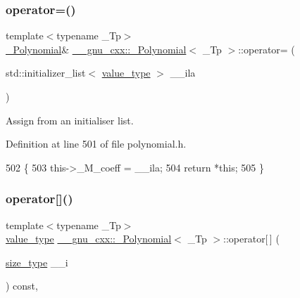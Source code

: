 \subsubsection{\texorpdfstring{operator=()}{operator=()}\hspace{0.1cm}{\footnotesize\ttfamily [4/4]}}
{\footnotesize\ttfamily template$<$typename \+\_\+\+Tp$>$ \\
\hyperlink{class____gnu__cxx_1_1__Polynomial}{\+\_\+\+Polynomial}\& \hyperlink{class____gnu__cxx_1_1__Polynomial}{\+\_\+\+\_\+gnu\+\_\+cxx\+::\+\_\+\+Polynomial}$<$ \+\_\+\+Tp $>$\+::operator= (\begin{DoxyParamCaption}\item[{std\+::initializer\+\_\+list$<$ \hyperlink{class____gnu__cxx_1_1__Polynomial_a725563351f50e76084a7a016c06f8a53}{value\+\_\+type} $>$}]{\+\_\+\+\_\+ila }\end{DoxyParamCaption})\hspace{0.3cm}{\ttfamily [inline]}}

Assign from an initialiser list. 

Definition at line 501 of file polynomial.\+h.


\begin{DoxyCode}
502       \{
503         this->\_M\_coeff = \_\_ila;
504         \textcolor{keywordflow}{return} *\textcolor{keyword}{this};
505       \}
\end{DoxyCode}
\mbox{\label{class____gnu__cxx_1_1__Polynomial_adda717f35cc87205daf0ea7a16d5d1a7}} 
\subsubsection{\texorpdfstring{operator[]()}{operator[]()}\hspace{0.1cm}{\footnotesize\ttfamily [1/2]}}
{\footnotesize\ttfamily template$<$typename \+\_\+\+Tp$>$ \\
\hyperlink{class____gnu__cxx_1_1__Polynomial_a725563351f50e76084a7a016c06f8a53}{value\+\_\+type} \hyperlink{class____gnu__cxx_1_1__Polynomial}{\+\_\+\+\_\+gnu\+\_\+cxx\+::\+\_\+\+Polynomial}$<$ \+\_\+\+Tp $>$\+::operator\mbox{[}$\,$\mbox{]} (\begin{DoxyParamCaption}\item[{\hyperlink{class____gnu__cxx_1_1__Polynomial_a8b25fcfd4acaad0c5c08b649c22da28a}{size\+\_\+type}}]{\+\_\+\+\_\+i }\end{DoxyParamCaption}) const\hspace{0.3cm}{\ttfamily [inline]}, {\ttfamily [noexcept]}}

